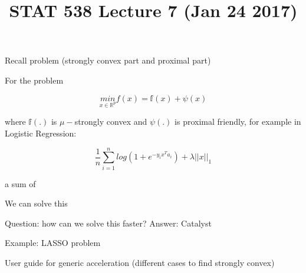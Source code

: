 \documentclass[12pt]{article}
\newcommand{\sumi}{\sum\limits_{i=1}^n}
\begin{document}
\title{STAT 538 Lecture 7 (Jan 24 2017)}
\maketitle

\noindent Recall problem (strongly convex part and proximal part)

\noindent For the problem 

\[
\underset{x \in \mathbb{R}^p}{min} f(x) = \mathbb{f}(x) + \psi(x)\]

\noindent where $\mathbb{f}(.)$ is $\mu-$strongly convex and $\psi(.)$ is proximal friendly, for example in Logistic Regression:

\[
\dfrac{1}{n} \sumi log(1 + e^{-y_i x^T a_i}) + \lambda ||x||_1
\]

\noindent a sum of 

\noindent We can solve this

\noindent Question: how can we solve this faster? Answer: Catalyst

\noindent Example: LASSO problem

\noindent User guide for generic acceleration (different cases to find strongly convex)

\noindent 
\end{document}
